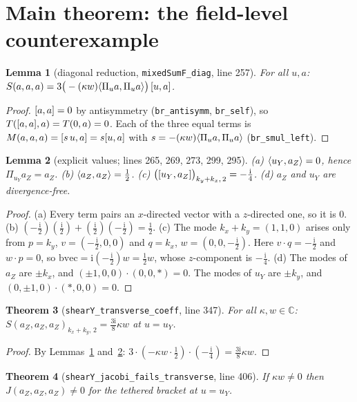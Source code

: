 \documentclass[11pt]{article}\emergencystretch=2em
\newtheorem{theorem}{Theorem}\newtheorem{lemma}[theorem]{Lemma}\newtheorem{proposition}[theorem]{Proposition}
\theoremstyle{definition}\newtheorem{definition}[theorem]{Definition}\theoremstyle{remark}\newtheorem{remark}[theorem]{Remark}
\newcommand{\ii}{\mathrm{i}}
\begin{document}
\section{Main theorem: the field-level counterexample}
\begin{lemma}[diagonal reduction, \texttt{mixedSumF\_diag}, line 257]\label{lem:diag}
For all $u,a$: $S(a,a,a)=3\big(-(\kappa w)\langle \Pi_u a,\Pi_u a\rangle\big)\,[u,a]$.
\end{lemma}
\begin{proof}
$[a,a]=0$ by antisymmetry (\texttt{br\_antisymm}, \texttt{br\_self}), so $T([a,a],a)=T(0,a)=0$. Each of the three equal terms is $M(a,a,a)=[s\,u,a]=s[u,a]$ with $s=-(\kappa w)\langle \Pi_u a,\Pi_u a\rangle$ (\texttt{br\_smul\_left}).
\end{proof}
\begin{lemma}[explicit values; lines 265, 269, 273, 299, 295]\label{lem:vals}
(a) $\langle u_Y,a_Z\rangle=0$, hence $\Pi_{u_Y}a_Z=a_Z$. (b) $\langle a_Z,a_Z\rangle=\tfrac12$. (c) $\big(\br{u_Y}{a_Z}\big)_{k_y+k_x,\,2}=-\tfrac{\ii}{4}$. (d) $a_Z$ and $u_Y$ are divergence-free.
\end{lemma}
\begin{proof}
(a) Every term pairs an $x$-directed vector with a $z$-directed one, so it is $0$.
(b) $(-\tfrac{\ii}{2})(\tfrac{\ii}{2})+(\tfrac{\ii}{2})(-\tfrac{\ii}{2})=\tfrac12$.
(c) The mode $k_x+k_y=(1,1,0)$ arises only from $p=k_y$, $v=(-\tfrac{\ii}2,0,0)$ and $q=k_x$, $w=(0,0,-\tfrac{\ii}2)$. Here $v\cdot q=-\tfrac{\ii}{2}$ and $w\cdot p=0$, so $\mathrm{bvec}=\ii(-\tfrac{\ii}{2})w=\tfrac12 w$, whose $z$-component is $-\tfrac{\ii}{4}$.
(d) The modes of $a_Z$ are $\pm k_x$, and $(\pm1,0,0)\cdot(0,0,\ast)=0$. The modes of $u_Y$ are $\pm k_y$, and $(0,\pm1,0)\cdot(\ast,0,0)=0$.
\end{proof}
\begin{theorem}[\texttt{shearY\_transverse\_coeff}, line 347]\label{thm:coeff}
For all $\kappa,w\in\mathbb C$: $S(a_Z,a_Z,a_Z)_{k_x+k_y,\,2}=\tfrac{3\ii}{8}\kappa w$ at $u=u_Y$.
\end{theorem}
\begin{proof}
By Lemmas~\ref{lem:diag} and~\ref{lem:vals}: $3\cdot(-\kappa w\cdot\tfrac12)\cdot(-\tfrac{\ii}{4})=\tfrac{3\ii}{8}\kappa w$.
\end{proof}
\begin{theorem}[\texttt{shearY\_jacobi\_fails\_transverse}, line 406]\label{thm:main}
If $\kappa w\ne0$ then $J(a_Z,a_Z,a_Z)\ne0$ for the tethered bracket at $u=u_Y$.
\end{theorem}
\end{document}
